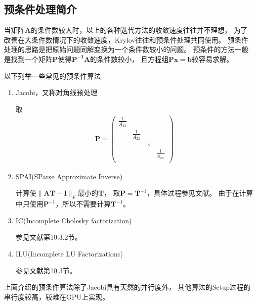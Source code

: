 \subsection{预条件处理简介}
当矩阵$\bm{A}$的条件数较大时，以上的各种迭代方法的收敛速度往往并不理想，
为了改善在大条件数情况下的收敛速度，Krylov往往和预条件处理共同使用。
预条件处理的思路是把原始问题同解变换为一个条件数较小的问题。
预条件的方法一般是找到一个矩阵$\bm{P}$使得$\bm{P^{-1}A}$的条件数较小，
且方程组$\bm{Px}=\bm{b}$较容易求解。\cite{saad2003iterative}

以下列举一些常见的预条件算法
\begin{enumerate}
\item Jacobi，又称对角线预处理

取\cite{saad2003iterative}
\begin{align}
  \bm{P}=\begin{pmatrix}
  \displaystyle \frac{1}{A_{11}} & & &\\
  & \displaystyle \frac{1}{A_{22}} & &\\
  & & \ddots &\\
  & & & \displaystyle \frac{1}{A_{nn}}\\
  \end{pmatrix}
\end{align}

\item SPAI(SParse Approximate Inverse)\cite{saad2003iterative}

计算使$\|\bm{AT}-\bm{I}\|_F$最小的$\bm{T}$，
取$\bm{P}=\bm{T}^{-1}$，具体过程参见文献。
由于在计算中只使用$\bm{P}^{-1}$，所以不需要计算$\bm{T}^{-1}$。

\item IC(Incomplete Cholesky factorization)

参见文献第10.3.2节。

\item ILU(Incomplete LU Factorizations)

参见文献第10.3节。

\end{enumerate}
上面介绍的预条件算法除了Jacobi具有天然的并行度外，
其他算法的Setup过程的串行度较高，较难在GPU上实现。



